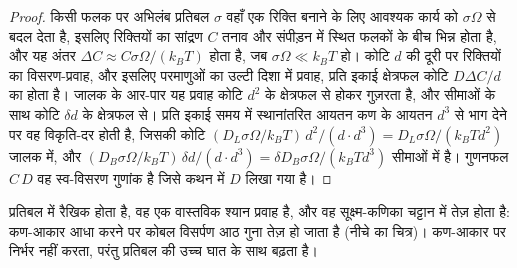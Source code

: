 \begin{proof}
किसी फलक पर अभिलंब प्रतिबल $\sigma$ वहाँ एक रिक्ति बनाने के लिए आवश्यक कार्य को
$\sigma\Omega$ से बदल देता है, इसलिए रिक्तियों का सांद्रण $C$ तनाव और संपीड़न में स्थित फलकों के बीच
भिन्न होता है, और यह अंतर $\Delta C \approx C\sigma\Omega/
(k_BT)$ होता है, जब $\sigma\Omega \ll k_BT$ हो। कोटि $d$ की दूरी पर
रिक्तियों का विसरण-प्रवाह, और इसलिए परमाणुओं का उल्टी दिशा में प्रवाह, प्रति इकाई क्षेत्रफल कोटि $D\Delta
C/d$ का होता है। जालक के आर-पार यह प्रवाह कोटि
$d^2$ के क्षेत्रफल से होकर गुज़रता है, और सीमाओं के साथ कोटि $\delta d$ के क्षेत्रफल से। प्रति इकाई समय में स्थानांतरित आयतन
कण के आयतन $d^3$ से भाग देने पर वह विकृति-दर होती है, जिसकी कोटि
$(D_L\sigma\Omega/k_BT)\,d^2/(d\cdot d^3) = D_L\sigma\Omega/(k_BTd^2)$ जालक में, और
$(D_B\sigma\Omega/k_BT)\,\delta d/(d\cdot d^3) = \delta D_B
\sigma\Omega/(k_BTd^3)$ सीमाओं में है। गुणनफल $C\,D$ वह
स्व-विसरण गुणांक है जिसे कथन में $D$ लिखा गया है।
\end{proof}

 प्रतिबल में रैखिक होता है, वह एक वास्तविक श्यान प्रवाह है, और वह सूक्ष्म-कणिका
चट्टान में तेज़ होता है: कण-आकार आधा करने पर कोबल विसर्पण आठ गुना तेज़ हो जाता है
(नीचे का चित्र)।  कण-आकार पर निर्भर नहीं करता, परंतु
प्रतिबल की उच्च घात के साथ बढ़ता है।

